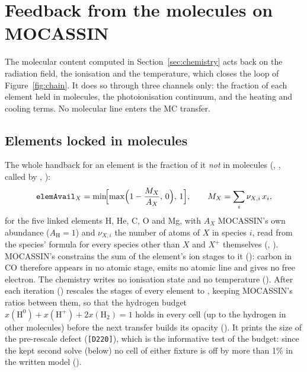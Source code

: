 \section{Feedback from the molecules on MOCASSIN}
\label{sec:feedback}

The molecular content computed in Section~\ref{sec:chemistry} acts back on
the radiation field, the ionisation and the temperature, which closes the
loop of Figure~\ref{fig:chain}. It does so through three channels only: the
fraction of each element held in molecules, the \Htwo{} photoionisation
continuum, and the heating and cooling terms. No molecular line enters the MC
transfer.

\subsection{Elements locked in molecules}

The whole handback for an element is the fraction of it \emph{not} in
molecules (, , called by
, ):
\begin{equation}
  \rtn{elemAvail}_X = \min\!\Bigl[\max\Bigl(1-\frac{M_X}{A_X},\,0\Bigr),\,1\Bigr],
  \qquad M_X = \sum_i \nu_{X,i}\,x_i ,
\end{equation}
for the five linked elements H, He, C, O and Mg, with $A_X$ MOCASSIN's own
abundance ($A_{\mathrm H}=1$) and $\nu_{X,i}$ the number of atoms of $X$ in
species $i$, read from the species' formula for every species other than $X$
and $X^+$ themselves (, ). MOCASSIN's
 constrains the sum of the element's ion stages to it
(): carbon in CO therefore appears in no
atomic stage, emits no atomic line and gives no free electron. The chemistry
writes no ionisation state and no temperature (). After each
iteration  () rescales the
stages of every element to , keeping MOCASSIN's ratios between
them, so that the hydrogen budget
$x(\mathrm H^0)+x(\mathrm H^+)+2x(\mathrm{H_2})=1$ holds in every cell (up to
the hydrogen in other molecules) before the next transfer builds its opacity
(). It prints the size of the pre-rescale defect (\texttt{[D220]}),
which is the informative test of the budget: since the kept second solve
(below) no cell of either fixture is off by more than 1\% in the written model
().

